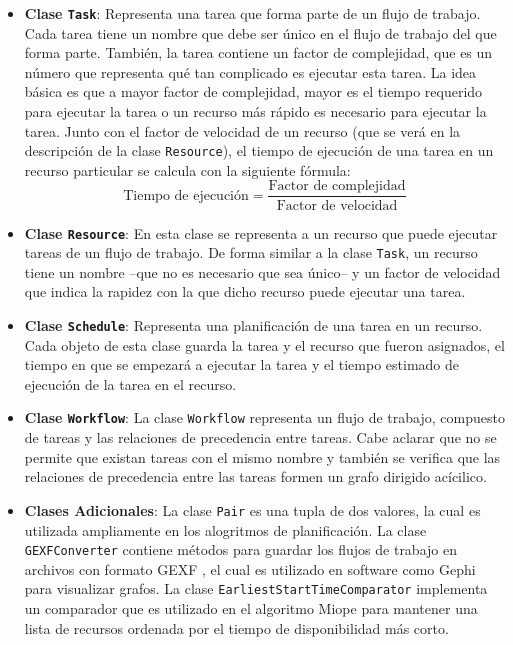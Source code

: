 \begin{itemize}

\item{\textbf{Clase \texttt{Task}}: Representa una tarea que forma parte de un flujo de trabajo. Cada tarea tiene un nombre que debe ser único en el flujo de trabajo del que forma parte. También, la tarea contiene un factor de complejidad, que es un número que representa qué tan complicado es ejecutar esta tarea. La idea básica es que a mayor factor de complejidad, mayor es el tiempo requerido para ejecutar la tarea o un recurso más rápido es necesario para ejecutar la tarea. Junto con el factor de velocidad de un recurso (que se verá en la descripción de la clase \texttt{Resource}), el tiempo de ejecución de una tarea en un recurso particular se calcula con la siguiente fórmula:
\begin{equation}
  \text{Tiempo de ejecución} = \frac{\text{Factor de complejidad}}{\text{Factor de velocidad}}
\end{equation}}

\item \textbf{Clase \texttt{Resource}}: En esta clase se representa a un recurso que puede ejecutar tareas de un flujo de trabajo. De forma similar a la clase \texttt{Task}, un recurso tiene un nombre --que no es necesario que sea único-- y un factor de velocidad que indica la rapidez con la que dicho recurso puede ejecutar una tarea.

\item \textbf{Clase \texttt{Schedule}}: Representa una planificación de una tarea en un recurso. Cada objeto de esta clase guarda la tarea y el recurso que fueron asignados, el tiempo en que se empezará a ejecutar la tarea y el tiempo estimado de ejecución de la tarea en el recurso.

\item \textbf{Clase \texttt{Workflow}}: La clase \texttt{Workflow} representa un flujo de trabajo, compuesto de tareas y las relaciones de precedencia entre tareas. Cabe aclarar que no se permite que existan tareas con el mismo nombre y también se verifica que las relaciones de precedencia entre las tareas formen un grafo dirigido acícilico.

\item \textbf{Clases Adicionales}: La clase \texttt{Pair} es una tupla de dos valores, la cual es utilizada ampliamente en los alogritmos de planificación. La clase \texttt{GEXFConverter} contiene métodos para guardar los flujos de trabajo en archivos con formato GEXF \cite{gexf2014}, el cual es utilizado en software como Gephi \cite{bastian2009gephi} para visualizar grafos. La clase \texttt{EarliestStartTimeComparator} implementa un comparador que es utilizado en el algoritmo Miope para mantener una lista de recursos ordenada por el tiempo de disponibilidad más corto.
\end{itemize}

